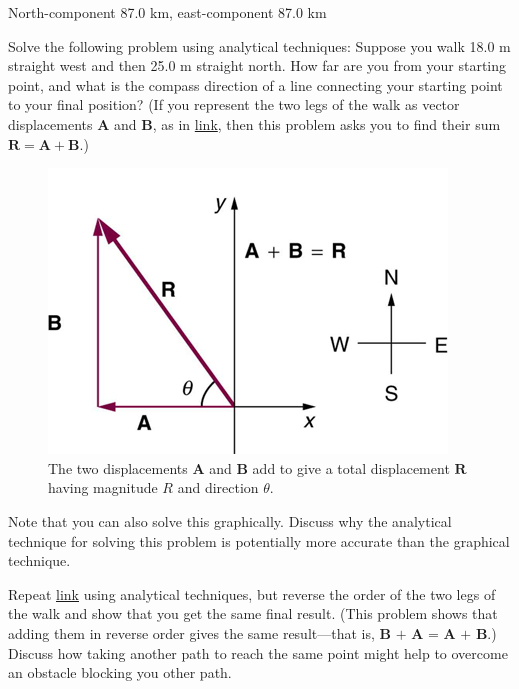 \documentclass[
]{book}
\begin{document}
\leavevmode{}%
North-component 87.0 km, east-component 87.0 km

\hypertarget{eip-287}{}
\leavevmode{}%
Solve the following problem using analytical techniques: Suppose you
walk 18.0 m straight west and then 25.0 m straight north. How far are
you from your starting point, and what is the compass direction of a
line connecting your starting point to your final position? (If you
represent the two legs of the walk as vector displacements
\(\mathbf{A}{}\) and \(\mathbf{B}{}\), as in
\protect\hyperlink{import-auto-id1165298935750}{link}, then this
problem asks you to find their sum
\({\mathbf{R} = {\mathbf{A} + \mathbf{B}}}{}\).)

\begin{figure}
\hypertarget{import-auto-id1165298935750}{%
\centering
\includegraphics{images/Figure_03_02_21a.jpg}
\caption{The two displacements \(\mathbf{A}{}\) and \(\mathbf{B}{}\) add to give a
total displacement \(\mathbf{R}{}\) having magnitude \(R{}\) and direction
\(\theta{}\).}\label{import-auto-id1165298935750}
}
\end{figure}

Note that you can also solve this graphically. Discuss why the
analytical technique for solving this problem is potentially more
accurate than the graphical technique.

\hypertarget{eip-430}{}
\leavevmode{}%
Repeat \protect\hyperlink{eip-287}{link} using analytical
techniques, but reverse the order of the two legs of the walk and show
that you get the same final result. (This problem shows that adding them
in reverse order gives the same result---that is,
\(\textbf{B\ +\ A\ =\ A\ +\ B}\).) Discuss how taking another path to
reach the same point might help to overcome an obstacle blocking you
other path.
\end{document}
